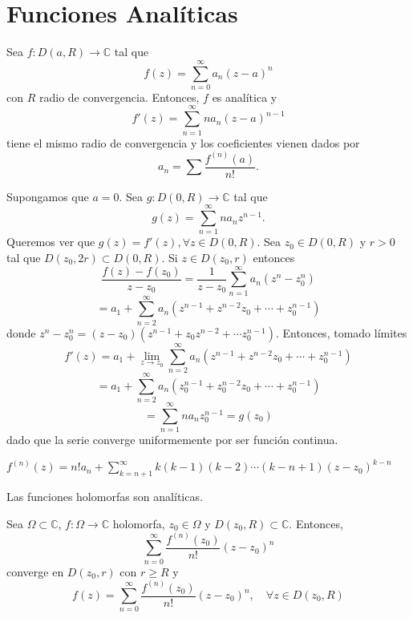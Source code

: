 \section{Funciones Analíticas}

\begin{theo}
  Sea $f : D(a, R) \to \mathbb{C}$ tal que
  \[
    f(z) = \sum_{n = 0}^{\infty} a_{n} (z - a)^{n}
  \]
  con $R$ radio de convergencia. Entonces, $f$ es analítica y
  \[ 
    f'(z) = \sum_{n = 1}^{\infty} n a_{n} (z - a)^{n - 1} 
  \] 
  tiene el mismo radio de convergencia y los coeficientes vienen dados por
  \[
    a_{n} = \sum \frac{f^{(n)}(a)}{n!}.
  \]
\end{theo}

\begin{dem}
  Supongamos que $a=0$. Sea $g : D(0, R) \to \mathbb{C}$ tal que
  \[ 
    g(z) = \sum_{n = 1}^{\infty} n a_{n} z^{n -1} .
  \] 
  Queremos ver que $g(z) = f'(z), \forall z \in D(0, R)$. Sea $z_{0} \in D(0, R)$ y $r>0$ tal que $D(z_{0}, 2r) \subset D(0, R)$. Si $z \in D(z_{0},r)$ entonces
  \[ 
    \frac{f(z) - f(z_{0})}{z - z_{0}} = \frac{1}{ z - z_{0}} \sum_{n = 1}^{\infty} a_{n} (z^{n} - z_{0}^{n}) 
  \] 
  \[ 
    = a_{1} + \sum_{n = 2}^{\infty} a_{n}(z^{n-1} + z^{n-2} z_{0} + \cdots + z_{0}^{n-1})
  \] 
  donde $z^{n} - z_{0}^{n} = (z - z_{0})(z^{n-1} + z_{0} z^{n-2} + \cdots z_{0}^{n-1})$. Entonces, tomado límites
  \[ 
    f'(z) = a_{1} + \lim_{z \to z_{0}} \sum_{n = 2}^{\infty} a_{n}(z^{n-1} + z^{n-2} z_{0} + \cdots + z_{0}^{n-1})
  \] 
  \[ 
    =  a_{1} + \sum_{n = 2}^{\infty} a_{n}(z_{0}^{n-1} + z_{0}^{n-2} z_{0} + \cdots + z_{0}^{n-1})
  \] 
  \[ 
    = \sum_{n = 1}^{\infty} n a_{n} z_{0}^{n -1} = g(z_{0}) 
  \] 
  dado que la serie converge uniformemente por ser función continua.
\end{dem}

\begin{obs}
  $f^{(n)}(z) = n! a_{n} + \sum_{k = n+1}^{\infty} k(k-1)(k-2) \cdots (k-n +1)(z - z_{0})^{k-n}$
\end{obs}

\begin{obs}
  Las funciones holomorfas son analíticas.
\end{obs}

\begin{theo}[Taylor]
  Sea $\Omega \subset \mathbb{C}$, $f : \Omega \to \mathbb{C}$ holomorfa, $z_{0} \in \Omega$ y $D(z_{0}, R) \subset \mathbb{C}$. Entonces, 
  \[ 
    \sum_{n = 0}^{\infty} \frac{f^{(n)}(z_{0})}{n!}(z - z_{0})^{n}
  \] 
  converge en $D(z_{0}, r)$ con $r \geq R$ y
  \[ 
    f(z) = \sum_{n = 0}^{\infty} \frac{f^{(n)}(z_{0})}{n!}(z - z_{0})^{n}, \quad \forall z \in D(z_{0}, R) 
  \] 
\end{theo}

